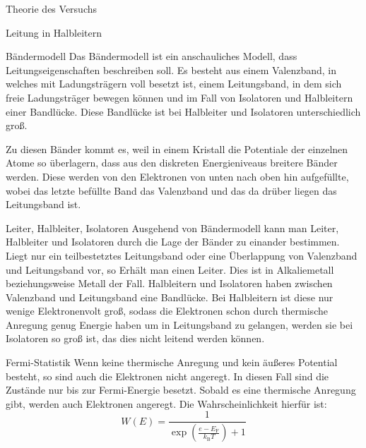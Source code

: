 \documentclass[pdftex, a4paper,11pt, twoside, ngerman]{report}
\begin{document}
  \begin{chapter}{Theorie des Versuchs}
    \label{chp:Theorie}
   
    \begin{section}{Leitung in Halbleitern}
        \begin{subsection}{Bändermodell}
            Das Bändermodell ist ein anschauliches Modell, dass Leitungseigenschaften beschreiben soll. 
            Es besteht aus einem Valenzband, in welches mit Ladungsträgern voll besetzt ist, einem Leitungsband, in dem sich freie Ladungsträger bewegen können und im Fall von Isolatoren und Halbleitern einer Bandlücke.
            Diese Bandlücke ist bei Halbleiter und Isolatoren unterschiedlich groß.

            Zu diesen Bänder kommt es, weil in einem Kristall die Potentiale der einzelnen Atome so überlagern, dass aus den diskreten Energieniveaus breitere Bänder werden.
            Diese werden von den Elektronen von unten nach oben hin aufgefüllte, wobei das letzte befüllte Band das Valenzband und das da drüber liegen das Leitungsband ist.

        \end{subsection}

        \begin{subsection}{Leiter, Halbleiter, Isolatoren}
            Ausgehend von Bändermodell kann man Leiter, Halbleiter und Isolatoren durch die Lage der Bänder zu einander bestimmen.
            Liegt nur ein teilbestetztes Leitungsband oder eine Überlappung von Valenzband und Leitungsband vor, so Erhält man einen Leiter.
            Dies ist in Alkaliemetall beziehungsweise Metall der Fall.
            Halbleitern und Isolatoren haben zwischen Valenzband und Leitungsband eine Bandlücke. 
            Bei Halbleitern ist diese nur wenige Elektronenvolt groß, sodass die Elektronen schon durch thermische Anregung genug Energie haben um in Leitungsband zu gelangen, werden sie bei Isolatoren so groß ist, das dies nicht leitend werden können.

        \end{subsection}

        \begin{subsection}{Fermi-Statistik}
            Wenn keine thermische Anregung und kein äußeres Potential besteht, so sind auch die Elektronen nicht angeregt.
            In diesen Fall sind die Zustände nur bis zur Fermi-Energie besetzt.
            Sobald es eine thermische Anregung gibt, werden auch Elektronen angeregt. Die Wahrscheinlichkeit hierfür ist:
            \[
                W(E) = \frac{1}{\exp({\frac{e-E_\text{F}}{k_\text{B}T}})+1}
            \]


\end{subsection}
\end{section}
\end{chapter}
\end{document}
